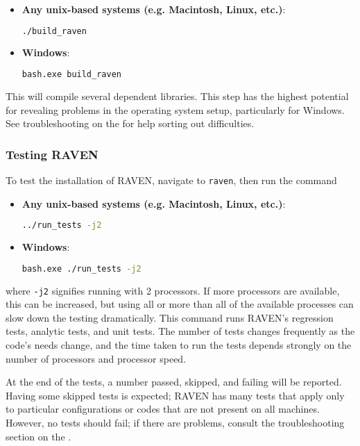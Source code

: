 \begin{itemize}

  \item \textbf{Any unix-based systems (e.g. Macintosh, Linux, etc.)}:
\begin{lstlisting}[language=bash]
./build_raven
\end{lstlisting}
  \item \textbf{Windows}:
  \begin{lstlisting}[language=bash]
bash.exe build_raven
\end{lstlisting}
  
\end{itemize}

This will compile several dependent libraries.  This step has the highest potential for revealing problems in
the operating system setup, particularly for Windows.  See troubleshooting on the \wiki for help sorting out
difficulties.


\subsubsection{Testing RAVEN}
\label{sec:testing raven}
To test the installation of RAVEN, navigate to \texttt{raven}, then run the command

\begin{itemize}

  \item \textbf{Any unix-based systems (e.g. Macintosh, Linux, etc.)}:
\begin{lstlisting}[language=bash]
../run_tests -j2
\end{lstlisting}
  \item \textbf{Windows}:
  \begin{lstlisting}[language=bash]
bash.exe ./run_tests -j2
\end{lstlisting}
  
\end{itemize}

where \texttt{-j2} signifies running with 2 processors.  If more processors are available, this can be
increased, but using all or more than all of the available processes can slow down the testing dramatically.
This command runs RAVEN's regression tests, analytic tests, and unit tests.  The number of tests changes
frequently as the code's needs change, and the time taken to run the tests depends strongly on the number of
processors and processor speed.

At the end of the tests, a number passed, skipped, and failing will be reported.  Having some skipped tests is
expected; RAVEN has many tests that apply only to particular configurations or codes that are not present on
all machines.  However, no tests should fail; if there are problems, consult the troubleshooting section on
the \wiki.


